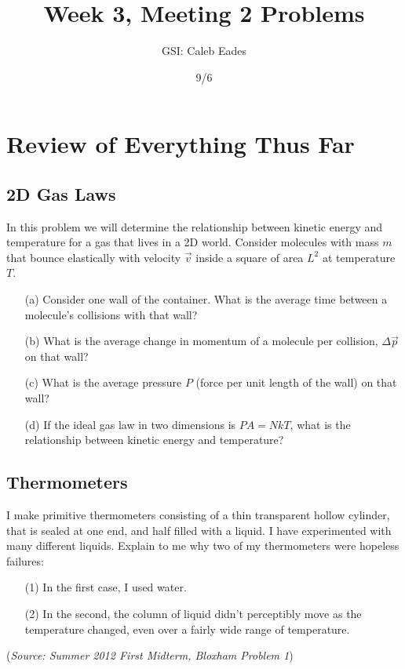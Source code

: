 \documentclass{article}
\begin{document}
	
\title{Week 3, Meeting 2 Problems}
\author{GSI: Caleb Eades}
\date{9/6}
\maketitle

\section{Review of Everything Thus Far}

\subsection{2D Gas Laws}

In this problem we will determine the relationship between kinetic energy and temperature for a gas that lives in a 2D world. Consider molecules with mass $m$ that bounce elastically with velocity $\vec{v}$ inside a square of area $L^2$ at temperature $T$.

\begin{itemize}
	\item[(a)] Consider one wall of the container. What is the average time between a molecule's collisions with that wall?
	\item[(b)] What is the average change in momentum of a molecule per collision, $\Delta\vec{p}$ on that wall?
	\item[(c)] What is the average pressure $P$ (force per unit length of the wall) on that wall?
	\item[(d)] If the ideal gas law in two dimensions is $PA = NkT$, what is the relationship between kinetic energy and temperature?
\end{itemize}

\subsection{Thermometers}

I make primitive thermometers consisting of a thin transparent hollow cylinder, that is sealed at one end, and half filled with a liquid. I have experimented with many different liquids. Explain to me why two of my thermometers were hopeless failures:
\begin{itemize}
	\item[(1)] In the first case, I used water.
	\item[(2)] In the second, the column of liquid didn't perceptibly move as the temperature changed, even over a fairly wide range of temperature.
\end{itemize}
(\textit{Source: Summer 2012 First Midterm, Bloxham Problem 1})
\end{document}
